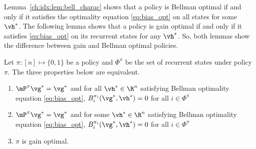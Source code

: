 Lemma~\ref{ch:idx:lem:bell_charac} shows that a policy is Bellman optimal if and only if it satisfies the optimality equation \eqref{eq:bias_opt} on all states for some $\vh^*$.
The following lemma shows that a policy is gain optimal if and only if it satisfies \eqref{eq:bias_opt} on its recurrent states for any $\vh^*$.
So, both lemmas show the difference between gain and Bellman optimal policies.
\begin{lem}
    \label{ch:mbp:lem:opt_pol}
    Let $\pi:[n]\mapsto\{0,1\}$ be a policy and $\Phi^\pi$ be the set of recurrent states under policy $\pi$.
    The three properties below are equivalent.
    \begin{enumerate}[label=(\roman*)]
        \item \label{it:opt_pol1} $\mP^\pi\vg^*=\vg^*$ and for all $\vh^*\in \R^{n}$ satisfying Bellman optimality equation \eqref{eq:bias_opt}, $B^{\pi_i}_i(\vg^*,\vh^*)=0$ for all $i\in\Phi^\pi$
        \item \label{it:opt_pol2} $\mP^\pi\vg^*=\vg^*$ and for some $\vh^*\in \R^{n}$ satisfying Bellman optimality equation \eqref{eq:bias_opt}, $B^{\pi_i}_i(\vg^*,\vh^*)=0$ for all $i\in\Phi^\pi$
        \item \label{it:opt_pol3} $\pi$ is gain optimal.
    \end{enumerate}
\end{lem}
